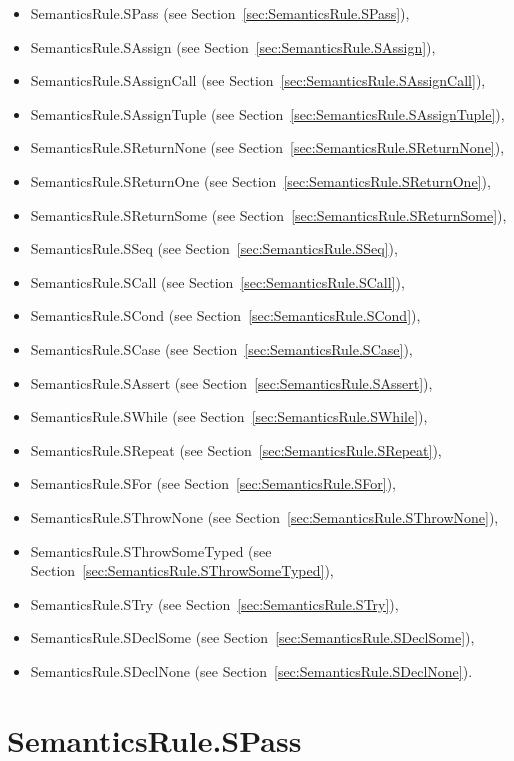 \documentclass{book}
\begin{document}
\begin{itemize}
\item SemanticsRule.SPass (see Section~\ref{sec:SemanticsRule.SPass}), 
\item SemanticsRule.SAssign (see Section~\ref{sec:SemanticsRule.SAssign}), 
\item SemanticsRule.SAssignCall (see Section~\ref{sec:SemanticsRule.SAssignCall}), 
\item SemanticsRule.SAssignTuple (see Section~\ref{sec:SemanticsRule.SAssignTuple}), 
\item SemanticsRule.SReturnNone (see Section~\ref{sec:SemanticsRule.SReturnNone}), 
\item SemanticsRule.SReturnOne (see Section~\ref{sec:SemanticsRule.SReturnOne}), 
\item SemanticsRule.SReturnSome (see Section~\ref{sec:SemanticsRule.SReturnSome}), 
\item SemanticsRule.SSeq (see Section~\ref{sec:SemanticsRule.SSeq}), 
\item SemanticsRule.SCall (see Section~\ref{sec:SemanticsRule.SCall}), 
\item SemanticsRule.SCond (see Section~\ref{sec:SemanticsRule.SCond}), 
\item SemanticsRule.SCase (see Section~\ref{sec:SemanticsRule.SCase}), 
\item SemanticsRule.SAssert (see Section~\ref{sec:SemanticsRule.SAssert}), 
\item SemanticsRule.SWhile (see Section~\ref{sec:SemanticsRule.SWhile}), 
\item SemanticsRule.SRepeat (see Section~\ref{sec:SemanticsRule.SRepeat}), 
\item SemanticsRule.SFor (see Section~\ref{sec:SemanticsRule.SFor}), 
\item SemanticsRule.SThrowNone (see Section~\ref{sec:SemanticsRule.SThrowNone}), 
\item SemanticsRule.SThrowSomeTyped (see Section~\ref{sec:SemanticsRule.SThrowSomeTyped}), 
\item SemanticsRule.STry (see Section~\ref{sec:SemanticsRule.STry}), 
\item SemanticsRule.SDeclSome (see Section~\ref{sec:SemanticsRule.SDeclSome}), 
\item SemanticsRule.SDeclNone (see Section~\ref{sec:SemanticsRule.SDeclNone}). 
\end{itemize}

\section{SemanticsRule.SPass \label{sec:SemanticsRule.SPass}}
\end{document}
